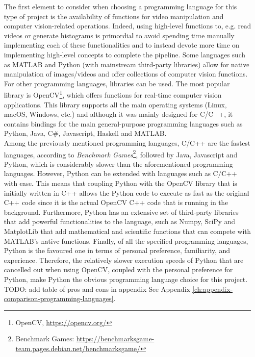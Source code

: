 The first element to consider when choosing a programming language for this type of project is the availability of functions for video manipulation and computer vision-related operations. Indeed, using high-level functions to, e.g. read videos or generate histograms is primordial to avoid spending time manually implementing each of these functionalities and to instead devote more time on implementing high-level concepts to complete the pipeline. Some languages such as MATLAB and Python (with mainstream third-party libraries) allow for native manipulation of images/videos and offer collections of computer vision functions. For other programming languages, libraries can be used. The most popular library is OpenCV\footnote{OpenCV, \url{https://opencv.org/}}, which offers functions for real-time computer vision applications. This library supports all the main operating systems (Linux, macOS, Windows, etc.) and although it was mainly designed for C/C++, it contains bindings for the main general-purpose programming languages such as Python, Java, C\#, Javascript, Haskell and MATLAB.\\

Among the previously mentioned programming languages, C/C++ are the fastest languages,
according to \textit{Benchmark Games}\footnote{Benchmark Games: \url{https://benchmarksgame-team.pages.debian.net/benchmarksgame/}}, followed by Java, Javascript and Python, which is considerably slower than the aforementioned programming languages. However, Python can be extended with languages such as C/C++ with ease. This means that coupling Python with the OpenCV library that is initially written in C++ allows the Python code to execute as fast as the original C++ code since it is the actual OpenCV C++ code that is running in the background. Furthermore, Python has an extensive set of third-party libraries that add powerful functionalities to the language, such as Numpy, SciPy and MatplotLib that add mathematical and scientific functions that can compete with MATLAB's native functions. Finally, of all the specified programming languages, Python is the favoured one in terms of personal preference, familiarity, and experience. Therefore, the relatively slower execution speeds of Python that are cancelled out when using OpenCV, coupled with the personal preference for Python, make Python the obvious programming language choice for this project.\\

TODO: add table of pros and cons in appendix See Appendix \ref{ch:appendix-comparison-programming-languages}.

